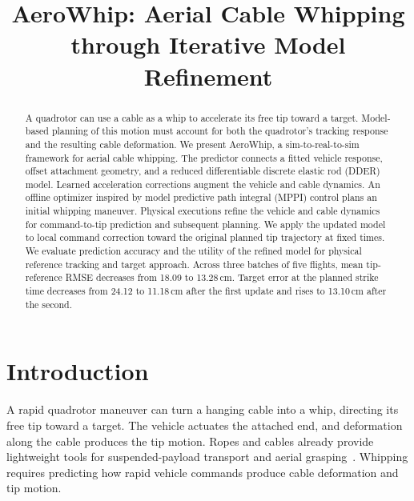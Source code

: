 \documentclass[letterpaper, 10 pt, conference]{ieeeconf}
\begin{document}


\title{\bf AeroWhip: Aerial Cable Whipping through Iterative Model Refinement}


\maketitle

\begin{abstract}
A quadrotor can use a cable as a whip to accelerate its free tip
toward a target. Model-based planning of this motion must account
for both the quadrotor's tracking response and the resulting cable
deformation. We present AeroWhip, a sim-to-real-to-sim framework
for aerial cable whipping. The predictor connects a fitted vehicle response, offset attachment
geometry, and a reduced differentiable discrete elastic rod (DDER)
model. Learned acceleration corrections augment the vehicle and
cable dynamics.
An offline optimizer inspired by model predictive path integral
(MPPI) control plans an initial whipping maneuver. Physical
executions refine the vehicle and cable dynamics for command-to-tip
prediction and subsequent planning. We apply the updated model to
local command correction toward the original planned tip trajectory
at fixed times.
We evaluate prediction accuracy and the utility of the refined
model for physical reference tracking and target approach.
Across three batches of five flights, mean tip-reference RMSE
decreases from 18.09 to 13.28\,cm. Target error at the planned
strike time decreases from 24.12 to 11.18\,cm after the first
update and rises to 13.10\,cm after the second.
\end{abstract}

\IEEEpeerreviewmaketitle


\section{Introduction}
\label{sec:introduction}

A rapid quadrotor maneuver can turn a hanging cable into a whip,
directing its free tip toward a target. The vehicle actuates the
attached end, and deformation along the cable produces the tip
motion. Ropes and cables already provide lightweight tools for
suspended-payload transport and aerial
grasping~\cite{sreenath2013trajectory,hitch}. Whipping requires
predicting how rapid vehicle commands produce cable deformation
and tip motion.
\end{document}
